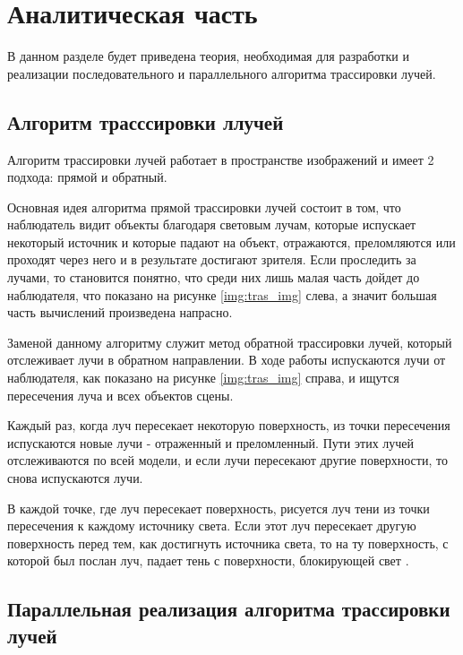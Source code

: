 \chapter{Аналитическая часть}

В данном разделе будет приведена теория, необходимая для разработки и реализации последовательного и параллельного алгоритма трассировки лучей.

\section{Алгоритм трасссировки ллучей}

 Алгоритм трассировки лучей работает в пространстве изображений и имеет 2 подхода: прямой и обратный.
 
 Основная идея алгоритма прямой трассировки лучей состоит в том, что наблюдатель видит объекты благодаря световым лучам, которые испускает некоторый источник и которые падают на объект, отражаются, преломляются или проходят через него и в результате достигают зрителя. Если проследить за лучами, то становится понятно, что среди них лишь малая часть дойдет до наблюдателя, что показано на рисунке \ref{img:tras_img} слева, а значит большая часть вычислений произведена напрасно.
 
 
 

 Заменой данному алгоритму служит метод обратной трассировки лучей, который отслеживает лучи в обратном направлении. В ходе работы испускаются лучи от наблюдателя, как показано на рисунке \ref{img:tras_img} справа, и ищутся пересечения луча и всех объектов сцены.
  
 Каждый раз, когда луч пересекает некоторую поверхность, из точки пересечения испускаются новые лучи - отраженный и преломленный. Пути этих лучей отслеживаются по всей модели, и если лучи пересекают другие поверхности, то снова испускаются лучи. 
 
 В каждой точке, где луч пересекает поверхность, рисуется луч тени из точки пересечения к каждому источнику света. Если этот луч пересекает другую поверхность перед тем, как достигнуть источника света, то на ту поверхность, с которой был послан луч, падает тень с поверхности, блокирующей свет \cite{trass}.
 


\section{Параллельная реализация алгоритма трассировки лучей}


